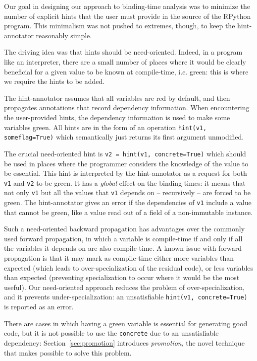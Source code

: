 Our goal in designing our approach to binding-time analysis was to
minimize the number of explicit hints that the user must provide in
the source of the RPython program.  This minimalism was not pushed to
extremes, though, to keep the hint-annotator reasonably simple.  

The driving idea was that hints should be need-oriented.  Indeed, in a
program like an interpreter, there are a small number of places where it
would be clearly beneficial for a given value to be known at
compile-time, i.e. green: this is where we require the hints to be
added.

The hint-annotator assumes that all variables are red by default, and
then propagates annotations that record dependency information.
When encountering the user-provided hints, the dependency information
is used to make some variables green.  All
hints are in the form of an operation \texttt{hint(v1, someflag=True)}
which semantically just returns its first argument unmodified.

The crucial need-oriented hint is \texttt{v2 = hint(v1, concrete=True)}
which should be used in places where the programmer considers the
knowledge of the value to be essential.  This hint is interpreted by
the hint-annotator as a request for both \texttt{v1} and \texttt{v2} to be green.  It
has a \emph{global} effect on the binding times: it means that not only
\texttt{v1} but all the values that \texttt{v1} depends on – recursively –
are forced to be green.  The hint-annotator gives an error if the
dependencies of \texttt{v1} include a value that cannot be green, like
a value read out of a field of a non-immutable instance.

Such a need-oriented backward propagation has advantages over the
commonly used forward propagation, in which a variable is compile-time
if and only if all the variables it depends on are also compile-time.  A
known issue with forward propagation is that it may mark as compile-time
either more variables than expected (which leads to over-specialization
of the residual code), or less variables than expected (preventing
specialization to occur where it would be the most useful).  Our
need-oriented approach reduces the problem of over-specialization, and
it prevents under-specialization: an unsatisfiable \texttt{hint(v1,
concrete=True)} is reported as an error.

There are cases in which having a green variable is essential for generating
good code, but it is not possible to use the \texttt{concrete} due to an
unsatisfiable dependency: Section~\ref{sec:promotion} introduces
\emph{promotion}, the novel technique that makes possible to solve this
problem.

